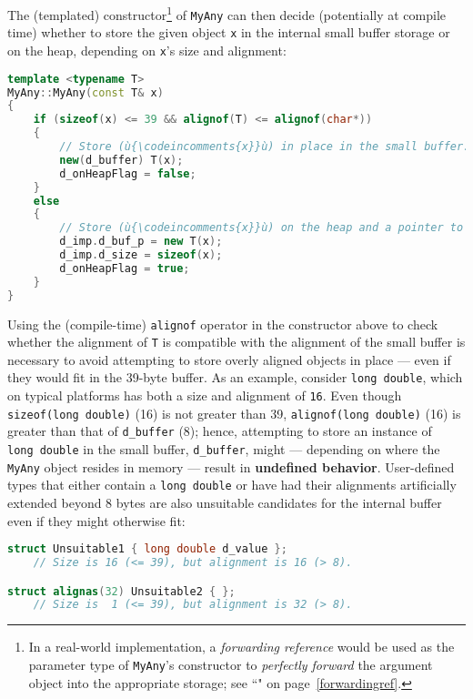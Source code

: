 \noindent The (templated) constructor{\cprotect\footnote{In a real-world
implementation, a \emph{forwarding reference} would be used as the
parameter type of \texttt{MyAny}'s constructor to
\emph{perfectly forward} the argument object into the appropriate
  storage; see ``" on page~\ref{forwardingref}.}} of \texttt{MyAny}
can then decide (potentially at compile time) whether to store the given
object \texttt{x} in the internal small buffer storage or on the heap,
depending on \texttt{x}'s size and alignment:

\begin{lstlisting}[language=C++]
template <typename T>
MyAny::MyAny(const T& x)
{
    if (sizeof(x) <= 39 && alignof(T) <= alignof(char*))
    {
        // Store (ù{\codeincomments{x}}ù) in place in the small buffer.
        new(d_buffer) T(x);
        d_onHeapFlag = false;
    }
    else
    {
        // Store (ù{\codeincomments{x}}ù) on the heap and a pointer to it in the small buffer.
        d_imp.d_buf_p = new T(x);
        d_imp.d_size = sizeof(x);
        d_onHeapFlag = true;
    }
}
\end{lstlisting}

\noindent Using the (compile-time) \texttt{alignof} operator in the constructor
above to check whether the alignment of \texttt{T} is compatible with
the alignment of the small buffer is necessary to avoid attempting to
store overly aligned objects in place --- even if they would fit in the
39-byte buffer. As an example, consider \texttt{long}~\texttt{double},
which on typical platforms has both a size and alignment of
\texttt{16}. Even though \texttt{sizeof(long}~\texttt{double)} (16) is not greater
than 39, \texttt{alignof(long}~\texttt{double)} (16) is greater than
that of \texttt{d\_buffer} (8); hence, attempting to store an instance
of \texttt{long}~\texttt{double} in the small buffer, \texttt{d\_buffer}, might
--- depending on where the \texttt{MyAny} object resides in memory --- result
in \textbf{undefined behavior}. User-defined types that either contain
a \texttt{long}~\texttt{double} or have had their alignments
artificially extended beyond 8 bytes are also unsuitable candidates for the
internal buffer even if they might otherwise fit:

\begin{lstlisting}[language=C++]
struct Unsuitable1 { long double d_value };
    // Size is 16 (<= 39), but alignment is 16 (> 8).

struct alignas(32) Unsuitable2 { };
    // Size is  1 (<= 39), but alignment is 32 (> 8).
\end{lstlisting}

